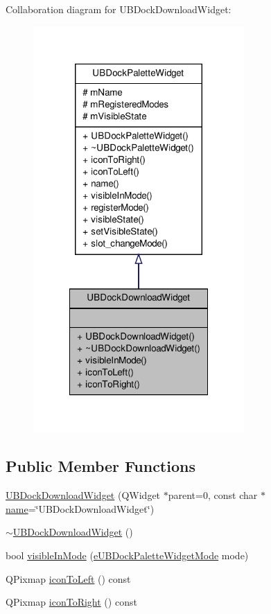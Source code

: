 Collaboration diagram for U\-B\-Dock\-Download\-Widget\-:
\nopagebreak
\begin{figure}[H]
\begin{center}
\leavevmode
\includegraphics[width=228pt]{d5/dbb/class_u_b_dock_download_widget__coll__graph}
\end{center}
\end{figure}
\subsection*{Public Member Functions}
\begin{DoxyCompactItemize}
\item 
\hyperlink{class_u_b_dock_download_widget_a0e0abf71df4a80490809ee9009b2bbba}{U\-B\-Dock\-Download\-Widget} (Q\-Widget $\ast$parent=0, const char $\ast$\hyperlink{class_u_b_dock_palette_widget_a1c7779c0584c0d2541b4c05acc1ffbbb}{name}=\char`\"{}U\-B\-Dock\-Download\-Widget\char`\"{})
\item 
\hyperlink{class_u_b_dock_download_widget_ac03924c680cb95cbcaeedec67a45d5f8}{$\sim$\-U\-B\-Dock\-Download\-Widget} ()
\item 
bool \hyperlink{class_u_b_dock_download_widget_a431285e77c135cf75bbc23398ca54d50}{visible\-In\-Mode} (\hyperlink{_u_b_dock_palette_widget_8h_af3b2828ed1bf91ad13c73e4e1b3b529e}{e\-U\-B\-Dock\-Palette\-Widget\-Mode} mode)
\item 
Q\-Pixmap \hyperlink{class_u_b_dock_download_widget_a8474519ab2378af0a8d6549dc33c7706}{icon\-To\-Left} () const 
\item 
Q\-Pixmap \hyperlink{class_u_b_dock_download_widget_a4ab9f642dd92add5dba52b8b48033d04}{icon\-To\-Right} () const 
\end{DoxyCompactItemize}
